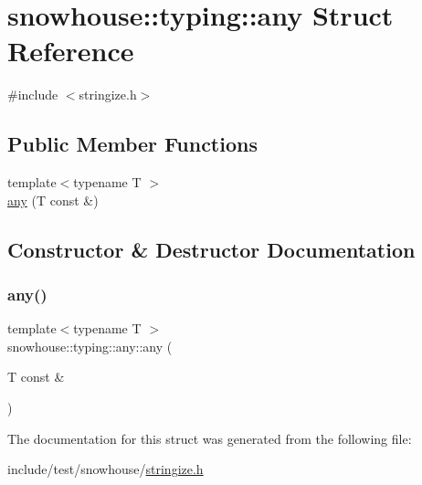 \hypertarget{structsnowhouse_1_1typing_1_1any}{}\section{snowhouse\+::typing\+::any Struct Reference}
\label{structsnowhouse_1_1typing_1_1any}


{\ttfamily \#include $<$stringize.\+h$>$}

\subsection*{Public Member Functions}
\begin{DoxyCompactItemize}
\item 
{\footnotesize template$<$typename T $>$ }\\\mbox{\hyperlink{structsnowhouse_1_1typing_1_1any_aa472ade7aaa1b47731532ff609a79482}{any}} (T const \&)
\end{DoxyCompactItemize}


\subsection{Constructor \& Destructor Documentation}
\mbox{\label{structsnowhouse_1_1typing_1_1any_aa472ade7aaa1b47731532ff609a79482}} 
\subsubsection{\texorpdfstring{any()}{any()}}
{\footnotesize\ttfamily template$<$typename T $>$ \\
snowhouse\+::typing\+::any\+::any (\begin{DoxyParamCaption}\item[{T const \&}]{ }\end{DoxyParamCaption})}



The documentation for this struct was generated from the following file\+:\begin{DoxyCompactItemize}
\item 
include/test/snowhouse/\mbox{\hyperlink{stringize_8h}{stringize.\+h}}\end{DoxyCompactItemize}
